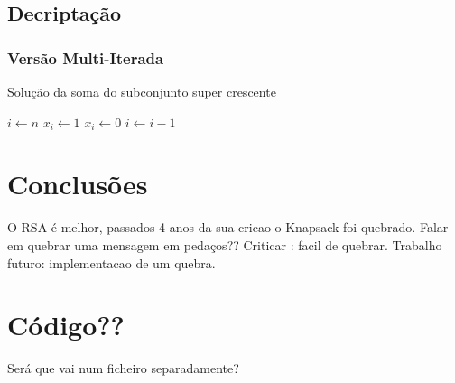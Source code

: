 \documentclass[11pt]{report}
\begin{document}
\section{Decriptação}

\subsection{Versão Multi-Iterada}

\begin{algorithm}
	\caption{Solução da soma do subconjunto super crescente}
	\begin{algorithmic}[1]
		\State $i \gets n$
				\State $x_i \gets 1$
			\Else
				\State $x_i \gets 0 $
			\EndIf
		\State $i \gets i - 1$
		\EndWhile
\end{algorithmic}
\end{algorithm}


\chapter{Conclusões}

O RSA é melhor, passados 4 anos da sua cricao o Knapsack foi quebrado.
Falar em quebrar uma mensagem em pedaços?? 
Criticar : facil de quebrar.
Trabalho futuro: implementacao de um quebra.

\appendix

\chapter{Código??}

Será que vai num ficheiro separadamente?
\end{document}
